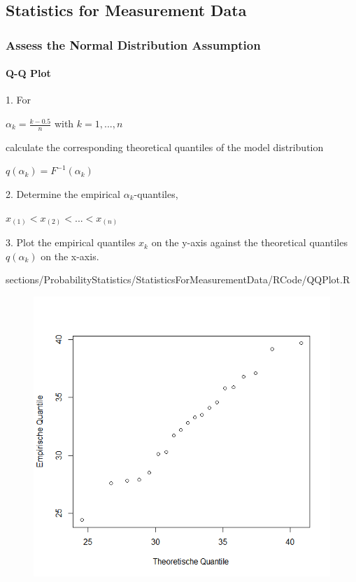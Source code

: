 \subsection{Statistics for Measurement Data}
\subsubsection{Assess the Normal Distribution Assumption}
{
		\paragraph{Q-Q Plot}
				\RTheory%
				{%
				1. For
				 \begin{center}
				 $\alpha_k=\frac{k-0.5}{n}$ with $k=1,...,n$\\
				 \end{center}
				 calculate the corresponding theoretical quantiles of the model distribution
				 \begin{center}
				  $q(\alpha_k)=F^{-1}(\alpha_k)$\\
				 \end{center}				 
				 2. Determine the empirical $\alpha_k$-quantiles,
				 \begin{center}
				  $x_{(1)}<x_{(2)}<...<x_{(n)}$\\
				 \end{center}				 
				3. Plot the empirical quantiles $x_k$ on the y-axis against the theoretical quantiles 					$q(\alpha_k)$ on the x-axis.		 
				}
				{
				sections/ProbabilityStatistics/StatisticsForMeasurementData/RCode/QQPlot.R
				}
\begin{figure}[H]
\begin{minipage}[c]{0.5\textwidth}
    \includegraphics[width=1\linewidth]{images/qqPlot.png}

\end{minipage}
\end{figure}}
